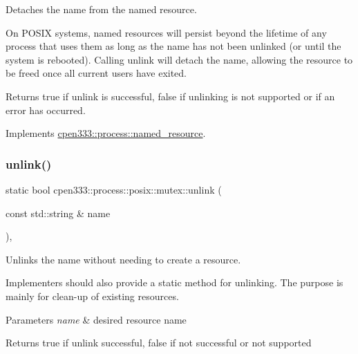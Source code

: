 Detaches the name from the named resource. 

On P\+O\+S\+IX systems, named resources will persist beyond the lifetime of any process that uses them as long as the name has not been unlinked (or until the system is rebooted). Calling {\ttfamily unlink} will detach the name, allowing the resource to be freed once all current users have exited.

\begin{DoxyReturn}{Returns}
{\ttfamily true} if unlink is successful, {\ttfamily false} if unlinking is not supported or if an error has occurred. 
\end{DoxyReturn}


Implements \hyperlink{classcpen333_1_1process_1_1named__resource_a5d33168fee48c9b0c58ab8fd96e230ce}{cpen333\+::process\+::named\+\_\+resource}.

\mbox{\label{classcpen333_1_1process_1_1posix_1_1mutex_ae5750c148e0408daac498a87d2d9a579}} 
\subsubsection{\texorpdfstring{unlink()}{unlink()}\hspace{0.1cm}{\footnotesize\ttfamily [2/2]}}
{\footnotesize\ttfamily static bool cpen333\+::process\+::posix\+::mutex\+::unlink (\begin{DoxyParamCaption}\item[{const std\+::string \&}]{name }\end{DoxyParamCaption})\hspace{0.3cm}{\ttfamily [inline]}, {\ttfamily [static]}}



Unlinks the name without needing to create a resource. 

Implementers should also provide a static method for unlinking. The purpose is mainly for clean-\/up of existing resources.


\begin{DoxyParams}{Parameters}
{\em name} & desired resource name \\
\hline
\end{DoxyParams}
\begin{DoxyReturn}{Returns}
{\ttfamily true} if unlink successful, {\ttfamily false} if not successful or not supported 
\end{DoxyReturn}
\mbox{\label{classcpen333_1_1process_1_1posix_1_1mutex_a822e51a57ea9e5de1a052aeddf3e4e02}} 
